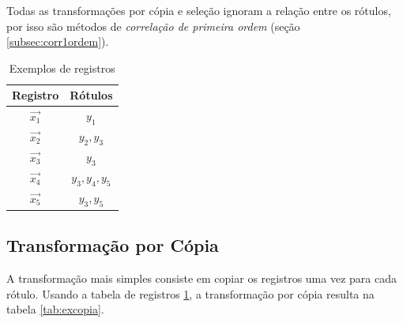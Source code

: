 \documentclass[runningheads,a4paper]{llncs}
\begin{document}
Todas as transformações por cópia e seleção ignoram a relação entre os rótulos, por isso são métodos de \textit{correlação de primeira ordem} (seção \ref{subsec:corr1ordem}).

\begin{table}
	\centering
	\begin{tabular}{| c | c |}
		\hline
		\textbf{Registro} & \textbf{Rótulos} \\
		\hline
		$\vec{x_1}$ & $y_1$ \\
		\hline
		$\vec{x_2}$ & $y_2, y_3$ \\
		\hline
		$\vec{x_3}$ & $y_3$ \\
		\hline
		$\vec{x_4}$ & $y_3, y_4, y_5$ \\
		\hline
		$\vec{x_5}$ & $y_3, y_5$ \\
		\hline
	\end{tabular}
	\caption{Exemplos de registros}
	\label{tab:exbase}
\end{table}

\subsection{Transformação por Cópia} \label{subsec:copia}

A transformação mais simples consiste em copiar os registros uma vez para cada rótulo. Usando a tabela de registros \ref{tab:exbase}, a transformação por cópia resulta na tabela \ref{tab:excopia}.
\end{document}
